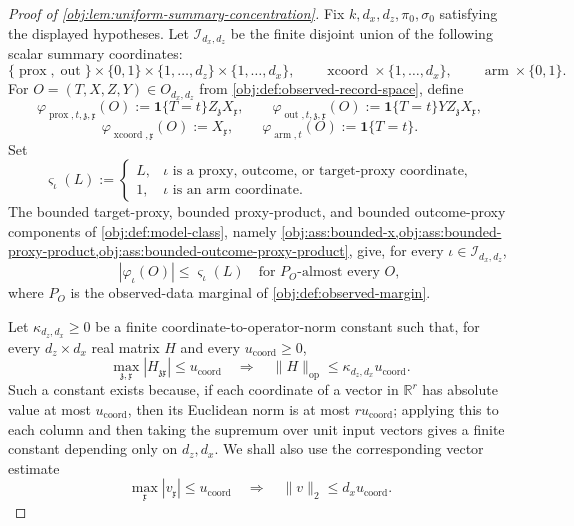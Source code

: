 \documentclass[11pt]{article}
\begin{document}
\begin{proof}[Proof of \cref{obj:lem:uniform-summary-concentration}]
Fix \(k,d_x,d_z,\pi_0,\sigma_0\) satisfying the displayed hypotheses.  Let
\(\mathcal I_{d_x,d_z}\) be the finite disjoint union of the following scalar
summary coordinates:
\[
\{\operatorname{prox},\operatorname{out}\}\times\{0,1\}
\times\{1,\ldots,d_z\}\times\{1,\ldots,d_x\},
\qquad
\operatorname{xcoord}\times\{1,\ldots,d_x\},
\qquad
\operatorname{arm}\times\{0,1\}.
\]
For \(O=(T,X,Z,Y)\in O_{d_x,d_z}\) from
\cref{obj:def:observed-record-space}, define
\[
\varphi_{\operatorname{prox},t,\mathfrak z,\mathfrak x}(O)
:=
\mathbf 1\{T=t\}Z_{\mathfrak z}X_{\mathfrak x},
\qquad
\varphi_{\operatorname{out},t,\mathfrak z,\mathfrak x}(O)
:=
\mathbf 1\{T=t\}YZ_{\mathfrak z}X_{\mathfrak x},
\]
\[
\varphi_{\operatorname{xcoord},\mathfrak x}(O):=X_{\mathfrak x},
\qquad
\varphi_{\operatorname{arm},t}(O):=\mathbf 1\{T=t\}.
\]
Set
\[
\varsigma_{\iota}(L):=
\begin{cases}
L, & \iota\text{ is a proxy, outcome, or target-proxy coordinate},\\
1, & \iota\text{ is an arm coordinate}.
\end{cases}
\]
The bounded target-proxy, bounded proxy-product, and bounded outcome-proxy
components of \cref{obj:def:model-class}, namely
\cref{obj:ass:bounded-x,obj:ass:bounded-proxy-product,obj:ass:bounded-outcome-proxy-product},
give, for every \(\iota\in\mathcal I_{d_x,d_z}\),
\[
|\varphi_\iota(O)|\le \varsigma_\iota(L)
\quad\text{for \(P_O\)-almost every }O,
\]
where \(P_O\) is the observed-data marginal of
\cref{obj:def:observed-margin}.  %

Let \(\kappa_{d_z,d_x}\ge0\) be a finite coordinate-to-operator-norm constant
such that, for every \(d_z\times d_x\) real matrix \(H\) and every
\(u_{\mathrm{coord}}\ge0\),
\[
\max_{\mathfrak z,\mathfrak x}|H_{\mathfrak z\mathfrak x}|
\le u_{\mathrm{coord}}
\quad\Longrightarrow\quad
\|H\|_{\mathrm{op}}\le \kappa_{d_z,d_x}u_{\mathrm{coord}}.
\]
Such a constant exists because, if each coordinate of a vector in
\(\mathbb R^r\) has absolute value at most \(u_{\mathrm{coord}}\), then its
Euclidean norm is at most \(r u_{\mathrm{coord}}\); applying this to each
column and then taking the supremum over unit input vectors gives a finite
constant depending only on \(d_z,d_x\).  We shall also use the corresponding
vector estimate
\[
\max_{\mathfrak x}|v_{\mathfrak x}|\le u_{\mathrm{coord}}
\quad\Longrightarrow\quad
\|v\|_2\le d_xu_{\mathrm{coord}} .
\]  %


\end{proof}
\end{document}
